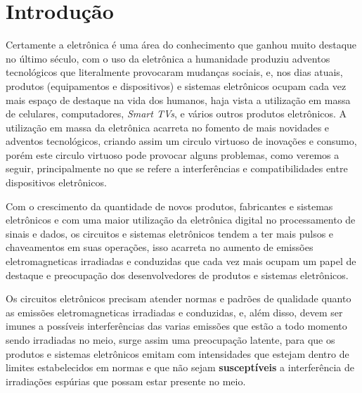 \chapter{Introdução}
Certamente a eletrônica é uma área do conhecimento que ganhou muito destaque no último século, com o uso da eletrônica a humanidade produziu adventos tecnológicos que literalmente provocaram mudanças sociais, e, nos dias atuais, produtos (equipamentos e dispositivos) e sistemas eletrônicos ocupam cada vez mais espaço de destaque na vida dos humanos, haja vista a utilização em massa de celulares, computadores, \textit{Smart TVs}, e vários outros produtos eletrônicos. A utilização em massa da eletrônica acarreta no fomento de mais novidades e adventos tecnológicos, criando assim um circulo virtuoso de inovações e consumo, porém este circulo virtuoso pode provocar alguns problemas, como veremos a seguir, principalmente no que se refere a interferências e compatibilidades entre dispositivos eletrônicos.


Com o crescimento da quantidade de novos produtos, fabricantes e sistemas eletrônicos e com uma maior utilização da eletrônica digital no processamento de sinais e dados, os circuitos e sistemas eletrônicos tendem a ter mais pulsos e chaveamentos em suas operações, isso acarreta no aumento de emissões eletromagneticas irradiadas e conduzidas que cada vez mais ocupam um papel de destaque e preocupação dos desenvolvedores de produtos e sistemas eletrônicos.


Os circuitos eletrônicos precisam atender normas e padrões de qualidade quanto as emissões eletromagneticas irradiadas e conduzidas, e, além disso, devem ser imunes a possíveis interferências das varias emissões que estão a todo momento sendo irradiadas no meio, surge assim uma preocupação latente, para que os produtos e sistemas eletrônicos emitam com intensidades que estejam dentro de limites estabelecidos em normas e que não sejam \textbf{susceptíveis} a interferência de irradiações espúrias que possam estar presente no meio.

